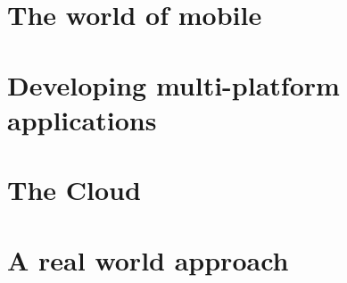 \part{The world of mobile}


\cleardoublepage
\ctparttext{}
\part{Developing multi-platform applications}



\ctparttext{}
\part{The Cloud}



\ctparttext{}
\part{A real world approach}






\appendix
\cleardoublepage

\cleardoublepage
\cleardoublepage

